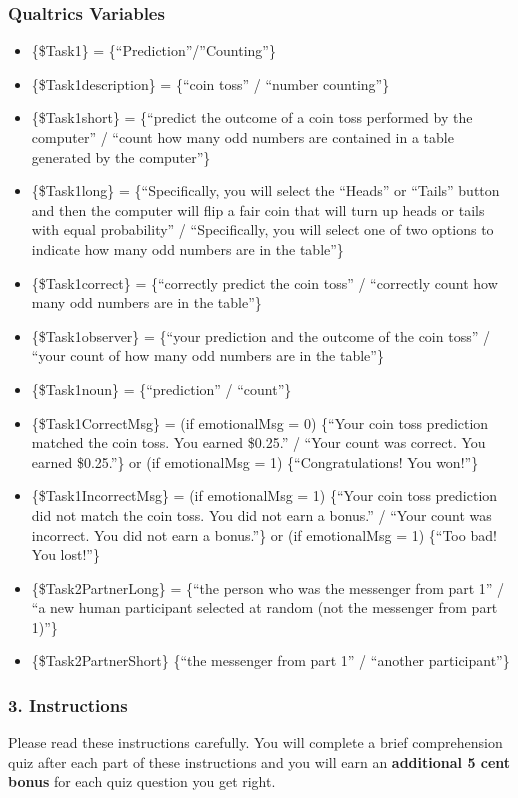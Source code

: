 \subsubsection*{Qualtrics Variables}
\begin{itemize}
\item \{\$Task1\} = \{``Prediction''/''Counting''\} 
\item \{\$Task1description\} = \{``coin toss''
/ ``number counting''\} 
\item \{\$Task1short\} = \{``predict the outcome of a coin toss
performed by the computer'' / ``count how many odd numbers are contained in a
table generated by the computer''\} 
\item \{\$Task1long\} = \{``Specifically, you will
select the ``Heads'' or ``Tails'' button and then the computer will flip a fair
coin that will turn up heads or tails with equal probability'' / ``Specifically,
you will select one of two options to indicate how many odd numbers are in the
table''\} 
\item \{\$Task1correct\} = \{``correctly predict the coin toss'' / ``correctly
count how many odd numbers are in the table''\} 
\item \{\$Task1observer\} = \{``your
prediction and the outcome of the coin toss'' / ``your count of how many odd
numbers are in the table''\} 
\item \{\$Task1noun\} = \{``prediction'' / ``count''\}
\item \{\$Task1CorrectMsg\} = (if emotionalMsg = 0) \{``Your coin toss prediction matched the coin toss. You
earned \$0.25.'' / ``Your count was correct. You earned \$0.25.''\} or 
(if emotionalMsg = 1) \{``Congratulations! You won!''\} 
\item \{\$Task1IncorrectMsg\} = (if emotionalMsg = 1) \{``Your coin toss prediction did not match the coin toss.
You did not earn a bonus.'' / ``Your count was incorrect. You did not earn a
bonus.''\} or (if emotionalMsg = 1) \{``Too bad! You lost!''\}
\item \{\$Task2PartnerLong\} = \{``the person who was the messenger from part 1'' / ``a
new human participant selected at random (not the messenger from part 1)''\}
\item \{\$Task2PartnerShort\} \{``the messenger from part 1'' / ``another participant''\}
\end{itemize}

\subsubsection*{3. Instructions}
Please read these instructions carefully. You will complete a brief
comprehension quiz after each part of these instructions and you will earn an
\textbf{additional 5 cent bonus} for each quiz question you get right. 

